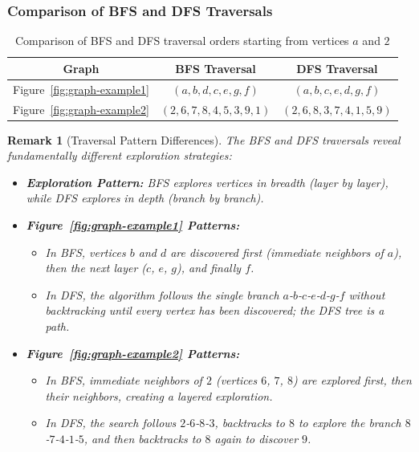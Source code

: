 \documentclass{article}
\newtheorem{remark}{Remark}
\theoremstyle{definition}
\begin{document}
\subsubsection{Comparison of BFS and DFS Traversals}

\begin{table}[h]
\centering
\begin{tabular}{|c|c|c|}
\hline
\textbf{Graph} & \textbf{BFS Traversal} & \textbf{DFS Traversal} \\
\hline
Figure~\ref{fig:graph-example1} & $(a, b, d, c, e, g, f)$ & $(a, b, c, e, d, g, f)$ \\
\hline
Figure~\ref{fig:graph-example2} & $(2, 6, 7, 8, 4, 5, 3, 9, 1)$ & $(2, 6, 8, 3, 7, 4, 1, 5, 9)$ \\
\hline
\end{tabular}
\caption{Comparison of BFS and DFS traversal orders starting from vertices $a$ and $2$}
\label{tab:traversal-comparison}
\end{table}

\begin{remark}[Traversal Pattern Differences]
The BFS and DFS traversals reveal fundamentally different exploration strategies:
\begin{itemize}
\item \textbf{Exploration Pattern:} BFS explores vertices in breadth (layer by layer), while DFS explores in depth (branch by branch).

\item \textbf{Figure~\ref{fig:graph-example1} Patterns:} 
  \begin{itemize}
  \item In BFS, vertices $b$ and $d$ are discovered first (immediate neighbors of $a$), then the next layer ($c$, $e$, $g$), and finally $f$.
  \item In DFS, the algorithm follows the single branch $a$-$b$-$c$-$e$-$d$-$g$-$f$ without backtracking until every vertex has been discovered; the DFS tree is a path.
  \end{itemize}
  
\item \textbf{Figure~\ref{fig:graph-example2} Patterns:}
  \begin{itemize}
  \item In BFS, immediate neighbors of $2$ (vertices $6$, $7$, $8$) are explored first, then their neighbors, creating a layered exploration.
  \item In DFS, the search follows $2$-$6$-$8$-$3$, backtracks to $8$ to explore the branch $8$-$7$-$4$-$1$-$5$, and then backtracks to $8$ again to discover $9$.
  \end{itemize}
\end{itemize}
\end{remark}
\end{document}
